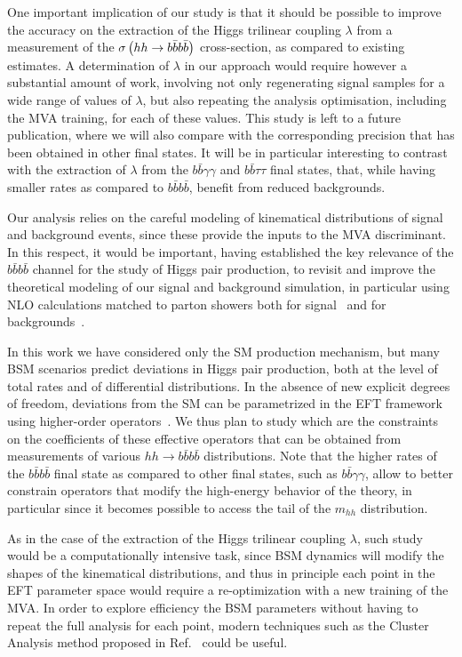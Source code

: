 One important implication of our study is that it should
be possible to improve  the accuracy on the extraction of
the Higgs trilinear coupling $\lambda$ from
a measurement of the
$\sigma\left( hh\to b\bar{b}b\bar{b}\right)$ cross-section, as compared
to existing estimates.
%
A determination of $\lambda$ in our approach would require
 however a substantial
 amount of work, involving
 not only regenerating signal samples
 for a wide range of values of  $\lambda$, but also
 repeating the analysis
optimisation, including the MVA training, for each
of these values.
%
This study is left to a future
publication, where we will also
compare with the corresponding  precision 
that has been obtained in other final states.
%
It will be in particular interesting to contrast
with the extraction of $\lambda$ from the
 $b\bar{b}\gamma\gamma$
and $b\bar{b}\tau\tau$ final states, that, while having
smaller rates as compared to $b\bar{b}b\bar{b}$,
benefit from reduced backgrounds.
%


Our analysis relies on the careful modeling of kinematical
distributions of signal and background events, since these provide
the inputs to the MVA discriminant.
%
In this respect, it would be important, having established the key
relevance of the $b\bar{b}b\bar{b}$ channel for the study of
Higgs pair production, to revisit and improve the
theoretical modeling of our signal and background simulation,
in particular using NLO calculations matched to
parton showers both for signal~\cite{Frederix:2014hta,Maierhofer:2013sha}
and for backgrounds~\cite{Alwall:2014hca,Gleisberg:2008ta}.
%

In this work we have considered only the SM production mechanism,
but many BSM scenarios predict deviations
in Higgs pair production, both at the level of total rates
and of
differential distributions.
%
In the absence of new explicit degrees of freedom,
deviations from the SM can be parametrized in
the EFT framework using higher-order
operators~\cite{Azatov:2015oxa,Goertz:2014qta}.
%
We thus plan to study which are the constraints
on the coefficients of these effective
operators that can be obtained from measurements
of various $hh\to b\bar{b}b\bar{b}$ distributions.
%
Note that the higher rates of the $b\bar{b}b\bar{b}$ final state as compared to
other final states, such as
$b\bar{b}\gamma\gamma$, allow to better constrain operators
that modify the high-energy behavior
of the theory, in particular
since it becomes possible
to access the tail of the $m_{hh}$ distribution.


As in the case of the extraction of the Higgs
trilinear coupling $\lambda$, such study
would be a computationally intensive task, since
BSM dynamics will modify the shapes of the kinematical
distributions, and thus in principle each point in the EFT parameter
space would require a re-optimization with a new training
of the MVA.
%
In order to explore efficiency the BSM parameters
without having to repeat the full analysis
for each point, modern techniques
such as the Cluster Analysis method proposed
in Ref.~\cite{Dall'Osso:2015aia} could be useful.

